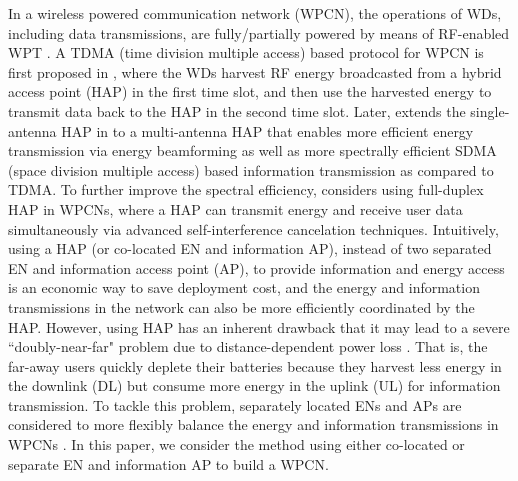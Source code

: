 \documentclass[journal, draftcls, one column, 12pt]{IEEEtran}
\begin{document}
In a wireless powered communication network (WPCN), the operations of WDs, including data transmissions, are fully/partially powered by means of RF-enabled WPT \cite{2014:Ju1,2014:Liu2,2014:Ju2,2014:Huang1,2014:Lee1,2015:Che,2015:Nasir,2014:Krikidis,2015:Chen}. A TDMA (time division multiple access) based protocol for WPCN is first proposed in \cite{2014:Ju1}, where the WDs harvest RF energy broadcasted from a hybrid access point (HAP) in the first time slot, and then use the harvested energy to transmit data back to the HAP in the second time slot. Later, \cite{2014:Liu2} extends the single-antenna HAP in \cite{2014:Ju1} to a multi-antenna HAP that enables more efficient energy transmission via energy beamforming as well as more spectrally efficient SDMA (space division multiple access) based information transmission as compared to TDMA. To further improve the spectral efficiency, \cite{2014:Ju2} considers using full-duplex HAP in WPCNs, where a HAP can transmit energy and receive user data simultaneously via advanced self-interference cancelation techniques. Intuitively, using a HAP (or co-located EN and information AP), instead of two separated EN and information access point (AP), to provide information and energy access is an economic way to save deployment cost, and the energy and information transmissions in the network can also be more efficiently coordinated by the HAP. However, using HAP has an inherent drawback that it may lead to a severe ``doubly-near-far" problem due to distance-dependent power loss \cite{2014:Ju1}. That is, the far-away users quickly deplete their batteries because they harvest less energy in the downlink (DL) but consume more energy in the uplink (UL) for information transmission. To tackle this problem, separately located ENs and APs are considered to more flexibly balance the energy and information transmissions in WPCNs \cite{2014:Huang1,2014:Lee1,2015:Che}. In this paper, we consider the method using either co-located or separate EN and information AP to build a WPCN.
\end{document}
